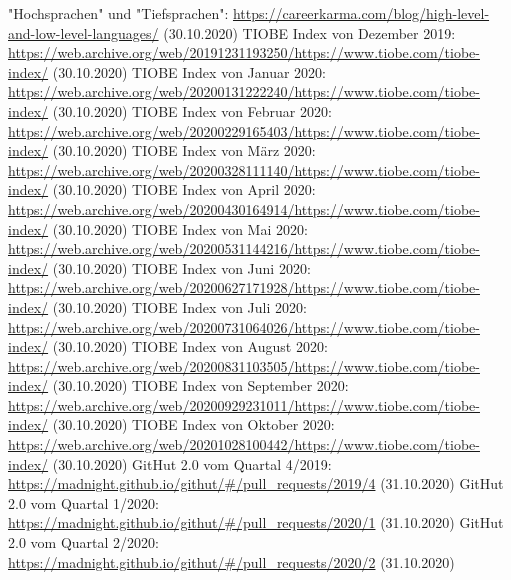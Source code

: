 \documentclass[ngerman]{article}
\begin{document}
\begin{thebibliography}{9}
        "Hochsprachen" und "Tiefsprachen": \url{https://careerkarma.com/blog/high-level-and-low-level-languages/} (30.10.2020)
        TIOBE Index von Dezember 2019: \url{https://web.archive.org/web/20191231193250/https://www.tiobe.com/tiobe-index/} (30.10.2020)
        TIOBE Index von Januar 2020: \url{https://web.archive.org/web/20200131222240/https://www.tiobe.com/tiobe-index/} (30.10.2020)
        TIOBE Index von Februar 2020: \url{https://web.archive.org/web/20200229165403/https://www.tiobe.com/tiobe-index/} (30.10.2020)
        TIOBE Index von März 2020: \url{https://web.archive.org/web/20200328111140/https://www.tiobe.com/tiobe-index/} (30.10.2020)
        TIOBE Index von April 2020: \url{https://web.archive.org/web/20200430164914/https://www.tiobe.com/tiobe-index/} (30.10.2020)
        TIOBE Index von Mai 2020: \url{https://web.archive.org/web/20200531144216/https://www.tiobe.com/tiobe-index/} (30.10.2020)
        TIOBE Index von Juni 2020: \url{https://web.archive.org/web/20200627171928/https://www.tiobe.com/tiobe-index/} (30.10.2020)
        TIOBE Index von Juli 2020: \url{https://web.archive.org/web/20200731064026/https://www.tiobe.com/tiobe-index/} (30.10.2020)
        TIOBE Index von August 2020: \url{https://web.archive.org/web/20200831103505/https://www.tiobe.com/tiobe-index/} (30.10.2020)
        TIOBE Index von September 2020: \url{https://web.archive.org/web/20200929231011/https://www.tiobe.com/tiobe-index/} (30.10.2020)
        TIOBE Index von Oktober 2020: \url{https://web.archive.org/web/20201028100442/https://www.tiobe.com/tiobe-index/} (30.10.2020)
        GitHut 2.0 vom Quartal 4/2019: \url{https://madnight.github.io/githut/#/pull_requests/2019/4} (31.10.2020)
        GitHut 2.0 vom Quartal 1/2020: \url{https://madnight.github.io/githut/#/pull_requests/2020/1} (31.10.2020)
        GitHut 2.0 vom Quartal 2/2020: \url{https://madnight.github.io/githut/#/pull_requests/2020/2} (31.10.2020)

\end{thebibliography}
\end{document}
